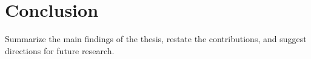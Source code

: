 \chapter{Conclusion} \label{chapter5}

Summarize the main findings of the thesis, restate the contributions, and suggest directions for future research.

